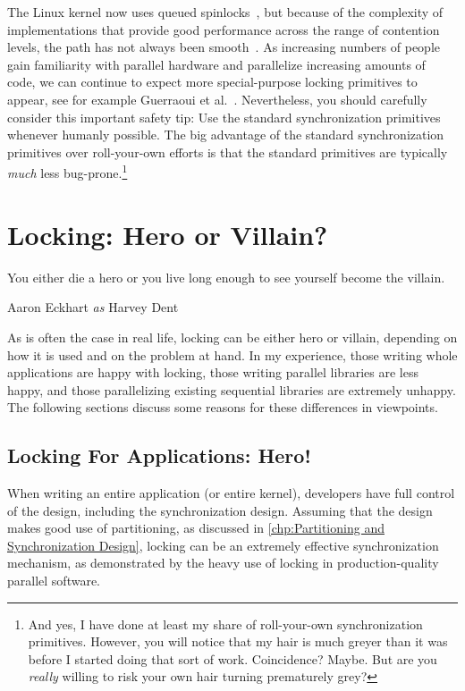 The Linux kernel now uses queued spinlocks~\cite{JonathanCorbet2014qspinlocks},
but because of the complexity of implementations that provide good
performance across the range of contention levels, the path has not
always been smooth~\cite{CatalinMarinas2018qspinlockTLA,WillDeacon2018qspinlock}.
As increasing numbers of people gain familiarity with parallel hardware
and parallelize increasing amounts of code, we can continue to expect more
special-purpose locking primitives to appear, see for example Guerraoui et
al.~\cite{Guerraoui:2019:LPA:3319851.3301501,HugoGuirouxPhD}.
Nevertheless, you should carefully consider this important safety tip:
Use the standard synchronization primitives whenever humanly possible.
The big advantage of the standard synchronization primitives over
roll-your-own efforts is that the standard primitives are typically
\emph{much} less bug-prone.\footnote{
	And yes, I have done at least my share of roll-your-own
	synchronization primitives.
	However, you will notice that my hair is much greyer than
	it was before I started doing that sort of work.
	Coincidence?
	Maybe.
	But are you \emph{really} willing to risk your own hair turning
	prematurely grey?}



\section{Locking:
		  Hero or Villain?}
\label{sec:locking:Locking: Hero or Villain?}
%
\epigraph{You either die a hero or you live long enough to see yourself
	  become the villain.}
	 {Aaron Eckhart \emph{as} Harvey Dent}

As is often the case in real life, locking can be either hero or villain,
depending on how it is used and on the problem at hand.
In my experience, those writing whole applications are happy with
locking, those writing parallel libraries are less happy, and those
parallelizing existing sequential libraries are extremely unhappy.
The following sections discuss some reasons for these differences in
viewpoints.

\subsection{Locking For Applications:
				      Hero!}
\label{sec:locking:Locking For Applications: Hero!}

When writing an entire application (or entire kernel), developers have
full control of the design, including the synchronization design.
Assuming that the design makes good use of partitioning, as discussed in
\cref{chp:Partitioning and Synchronization Design}, locking
can be an extremely effective synchronization mechanism, as demonstrated
by the heavy use of locking in production-quality parallel software.

